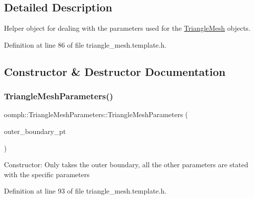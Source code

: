\subsection{Detailed Description}
Helper object for dealing with the parameters used for the \hyperlink{classoomph_1_1TriangleMesh}{Triangle\+Mesh} objects. 

Definition at line 86 of file triangle\+\_\+mesh.\+template.\+h.



\subsection{Constructor \& Destructor Documentation}
\mbox{\label{classoomph_1_1TriangleMeshParameters_ac8e4f397da81bbeaf03aaea8ce85272c}} 
\subsubsection{\texorpdfstring{Triangle\+Mesh\+Parameters()}{TriangleMeshParameters()}\hspace{0.1cm}{\footnotesize\ttfamily [1/3]}}
{\footnotesize\ttfamily oomph\+::\+Triangle\+Mesh\+Parameters\+::\+Triangle\+Mesh\+Parameters (\begin{DoxyParamCaption}\item[{\hyperlink{classoomph_1_1Vector}{Vector}$<$ \hyperlink{classoomph_1_1TriangleMeshClosedCurve}{Triangle\+Mesh\+Closed\+Curve} $\ast$$>$ \&}]{outer\+\_\+boundary\+\_\+pt }\end{DoxyParamCaption})\hspace{0.3cm}{\ttfamily [inline]}}

Constructor\+: Only takes the outer boundary, all the other parameters are stated with the specific parameters 

Definition at line 93 of file triangle\+\_\+mesh.\+template.\+h.

\mbox{\label{classoomph_1_1TriangleMeshParameters_a674b9be72cdd5c72877f07b434882704}} 
